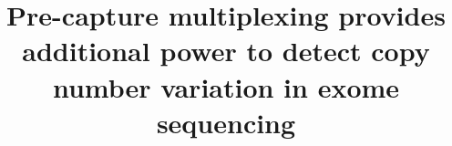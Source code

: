 \documentclass{bmcart}\usepackage[]{graphicx}\usepackage[]{color}
\begin{document}
\begin{frontmatter}

\begin{fmbox}

\title{Pre-capture multiplexing provides additional power to detect copy number variation in exome sequencing}

\author[
  addressref={gen,renci},
  corref={gen},
  email={dayne\_filer@med.unc.edu}
]{}
\author[addressref={renci}]{}
\author[addressref={gen}]{}
\author[addressref={gen}]{}
\author[addressref={gen}]{}
\author[addressref={gen}]{}
\author[addressref={gen,renci,lib}]{}
\author[addressref={gen,bios}]{}
\author[addressref={renci}]{}
\author[addressref={renci}]{}
\author[addressref={gen,renci}]{}
\author[addressref={gen,renci}]{}
\author[addressref={renci}]{}
\author[addressref={gen,renci,neuro}]{}

\address[id=gen]{%
  ,
  ,
  ,
}
\address[id=renci]{%
  ,
  ,
}
\address[id=lib]{%
  ,
  ,
}
\address[id=bios]{%
  ,
  ,
  ,
}

\address[id=neuro]{%
  ,
  ,
  ,
}


\end{fmbox}%



\begin{abstractbox}



\end{abstractbox}
\end{frontmatter}
\end{document}
